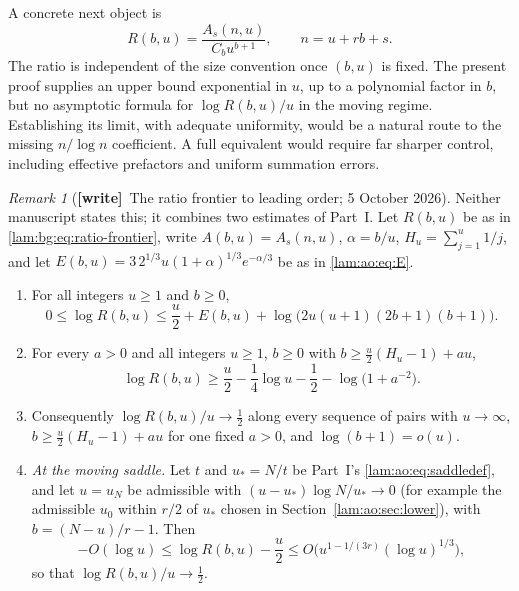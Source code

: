 \documentclass[11pt,a4paper]{article}
\numberwithin{equation}{section}
\theoremstyle{remark}
\newtheorem{remark}[theorem]{Remark}
\newcommand{\wtag}{\textup{\textbf{[write]}}}
\begin{document}
A concrete next object is
\begin{equation}\label{lam:bg:eq:ratio-frontier}
 R(b,u)=\frac{A_s(n,u)}{C_bu^{b+1}},\qquad n=u+rb+s.
\end{equation}
The ratio is independent of the size convention once $(b,u)$ is fixed. The present proof supplies an upper bound exponential in $u$, up to a polynomial factor in $b$, but no asymptotic formula for $\log R(b,u)/u$ in the moving regime. Establishing its limit, with adequate uniformity, would be a natural route to the missing $n/\log n$ coefficient. A full equivalent would require far sharper control, including effective prefactors and uniform summation errors.

\begin{remark}[\wtag\ The ratio frontier to leading order; 5 October 2026]\label{lam:bg:rem:ratio}
Neither manuscript states this; it combines two estimates of Part~I. Let $R(b,u)$ be as in \eqref{lam:bg:eq:ratio-frontier}, write $A(b,u)=A_s(n,u)$, $\alpha=b/u$, $H_u=\sum_{j=1}^u1/j$, and let $E(b,u)=3\,2^{1/3}u(1+\alpha)^{1/3}e^{-\alpha/3}$ be as in \eqref{lam:ao:eq:E}.
\begin{enumerate}
\item For all integers $u\ge1$ and $b\ge0$,
\begin{equation}\label{lam:bg:eq:ratio-upper}
 0\le\log R(b,u)\le\frac u2+E(b,u)+\log\bigl(2u(u+1)(2b+1)(b+1)\bigr).
\end{equation}
\item For every $a>0$ and all integers $u\ge1$, $b\ge0$ with $b\ge\frac u2(H_u-1)+au$,
\begin{equation}\label{lam:bg:eq:ratio-lower}
 \log R(b,u)\ge\frac u2-\frac14\log u-\frac12-\log\bigl(1+a^{-2}\bigr).
\end{equation}
\item Consequently $\log R(b,u)/u\to\frac12$ along every sequence of pairs with $u\to\infty$, $b\ge\frac u2(H_u-1)+au$ for one fixed $a>0$, and $\log(b+1)=o(u)$.
\item \emph{At the moving saddle.} Let $t$ and $u_*=N/t$ be Part~I's \eqref{lam:ao:eq:saddledef}, and let $u=u_N$ be admissible with $(u-u_*)\log N/u_*\to0$ (for example the admissible $u_0$ within $r/2$ of $u_*$ chosen in Section~\ref{lam:ao:sec:lower}), with $b=(N-u)/r-1$. Then
\begin{equation}\label{lam:bg:eq:ratio-saddle}
 -O(\log u)\le\log R(b,u)-\frac u2\le O\bigl(u^{1-1/(3r)}(\log u)^{1/3}\bigr),
\end{equation}
so that $\log R(b,u)/u\to\frac12$.
\end{enumerate}
\end{remark}
\end{document}
